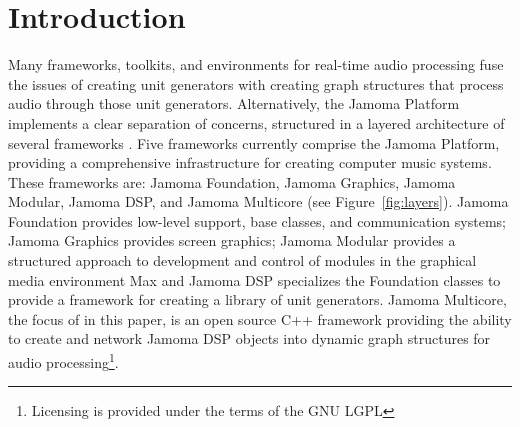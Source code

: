 \documentclass[twoside,a4paper]{article}
\title{\papertitle}
\begin{document}

\maketitle





\begin{abstract}

Jamoma Multicore is a framework for creating graph structures in which unit generators are connected together to process multichannel audio in real-time.  The main applications currently are processing of multichannel audio signals in Max/MSP and PureData as well as live audio coding in Ruby.  Jamoma Multicore forms part of the Jamoma layered architecture.

\end{abstract}




\section{Introduction} %
\label{sec:intro}

Many frameworks, toolkits, and environments for real-time audio processing fuse the issues of creating unit generators with creating graph structures that process audio through those unit generators.  Alternatively, the Jamoma Platform implements a clear separation of concerns, structured in a layered architecture of several frameworks \cite{Place:2010}. Five frameworks currently comprise the Jamoma Platform, providing a comprehensive infrastructure for creating computer music systems. These frameworks are: Jamoma Foundation, Jamoma Graphics, Jamoma Modular, Jamoma DSP, and Jamoma Multicore (see Figure~\ref{fig:layers}). Jamoma Foundation provides low-level support, base classes, and communication systems; Jamoma Graphics provides screen graphics; Jamoma Modular provides a structured approach to development and control of modules in the graphical media environment Max \cite{Place:2006} and Jamoma DSP specializes the Foundation classes to provide a framework for creating a library of unit generators. Jamoma Multicore, the focus of in this paper, is an open source C++ framework providing the ability to create and network Jamoma DSP objects into dynamic graph structures for audio processing\footnote{Licensing is provided under the terms of the GNU LGPL}.  
\end{document}
